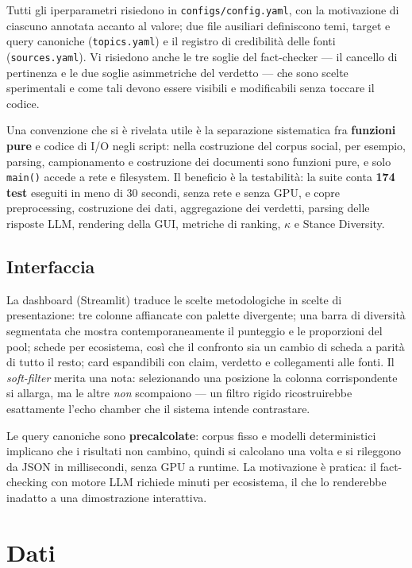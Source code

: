 \documentclass[11pt,a4paper]{report}
\begin{document}
Tutti gli iperparametri risiedono in \texttt{configs/config.yaml}, con la motivazione di
ciascuno annotata accanto al valore; due file ausiliari definiscono temi, target e query
canoniche (\texttt{topics.yaml}) e il registro di credibilità delle fonti
(\texttt{sources.yaml}). Vi risiedono anche le tre soglie del fact-checker --- il cancello di
pertinenza e le due soglie asimmetriche del verdetto --- che sono scelte sperimentali e come tali
devono essere visibili e modificabili senza toccare il codice.

Una convenzione che si è rivelata utile è la separazione sistematica fra \textbf{funzioni pure}
e codice di I/O negli script: nella costruzione del corpus social, per esempio, parsing,
campionamento e costruzione dei documenti sono funzioni pure, e solo \texttt{main()} accede a
rete e filesystem. Il beneficio è la testabilità: la suite conta \textbf{174 test} eseguiti in
meno di 30 secondi, senza rete e senza GPU, e copre preprocessing, costruzione dei dati,
aggregazione dei verdetti, parsing delle risposte LLM, rendering della GUI, metriche di ranking,
$\kappa$ e Stance Diversity.

\section{Interfaccia}
La dashboard (Streamlit) traduce le scelte metodologiche in scelte di presentazione: tre colonne
affiancate con palette divergente; una barra di diversità segmentata che mostra
contemporaneamente il punteggio e le proporzioni del pool; schede per ecosistema, così che il
confronto sia un cambio di scheda a parità di tutto il resto; card espandibili con claim,
verdetto e collegamenti alle fonti. Il \emph{soft-filter} merita una nota: selezionando una
posizione la colonna corrispondente si allarga, ma le altre \emph{non} scompaiono --- un filtro
rigido ricostruirebbe esattamente l'echo chamber che il sistema intende contrastare.

Le query canoniche sono \textbf{precalcolate}: corpus fisso e modelli deterministici implicano
che i risultati non cambino, quindi si calcolano una volta e si rileggono da JSON in
millisecondi, senza GPU a runtime. La motivazione è pratica: il fact-checking con motore LLM
richiede minuti per ecosistema, il che lo renderebbe inadatto a una dimostrazione interattiva.

\chapter{Dati}\label{cap:dati}
\end{document}
